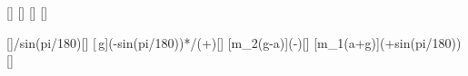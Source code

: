 [\mpss]
[\degree]
[\kg]
[\kg]

[]{\mZwX/sin(\wiX*pi/180)}[\kg]
[\,g]{(\mZwX-\mEiX*sin(\wiX*pi/180))*\gEX/(\mEiX+\mZwX)}[\mpss]
[m_2\left(g-a\right)]{\mZwX*(\gEX-\aKiX)}[\newton]
[m_1\left(a+g\sin\alpha\right)]{\mEiX*(\aKiX+\gEX*sin(\wiX*pi/180))}[\newton]

